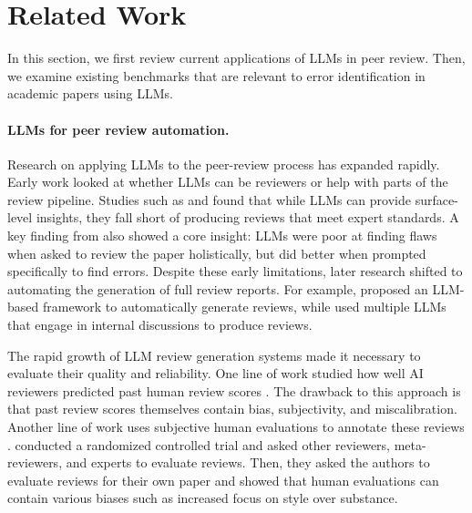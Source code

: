 \documentclass{article}
\begin{document}
\section{Related Work}
\label{section:related_work}
In this section, we first review current applications of LLMs in peer review. Then, we examine existing benchmarks that are relevant to error identification in academic papers using LLMs.

\paragraph{LLMs for peer review automation.} Research on applying LLMs to the peer-review process has expanded rapidly. Early work looked at whether LLMs can be reviewers or help with parts of the review pipeline. Studies such as \citet{yuan2022} and \citet{liu2023} found that while LLMs can provide surface-level insights, they fall short of producing reviews that meet expert standards. A key finding from \citet{liu2023} also showed a core insight: LLMs were poor at finding flaws when asked to review the paper holistically, but did better when prompted specifically to find errors. Despite these early limitations, later research shifted to automating the generation of full review reports. For example, \citet{yu2024} proposed an LLM-based framework to automatically generate reviews, while \citet{darcy2024} used multiple LLMs that engage in internal discussions to produce reviews.

The rapid growth of LLM review generation systems made it necessary to evaluate their quality and reliability. One line of work studied how well AI reviewers predicted past human review scores \citep{checco2021aiassisted,idahl2025,shcherbiak2024evaluating,thelwall2024predictive}. The drawback to this approach is that past review scores themselves contain bias, subjectivity, and miscalibration. Another line of work uses subjective human evaluations to annotate these reviews \citep{liang2023usefulfeedback, darcy2024, tyser2024}. \citet{goldberg2025peer} conducted a randomized controlled trial and asked other reviewers, meta-reviewers, and experts to evaluate reviews. Then, they asked the authors to evaluate reviews for their own paper and showed that human evaluations can contain various biases such as increased focus on style over substance.
\end{document}
